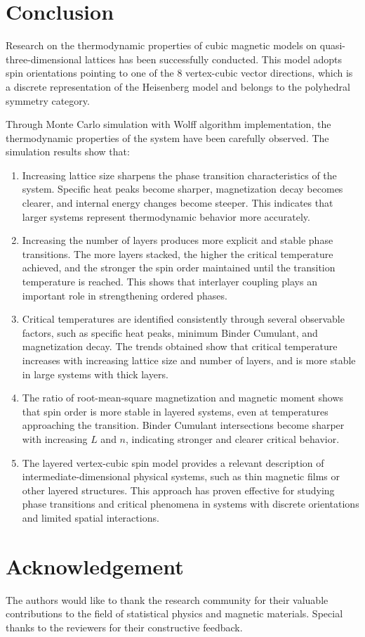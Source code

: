 \section{Conclusion}

Research on the thermodynamic properties of cubic magnetic models on quasi-three-dimensional lattices has been successfully conducted. This model adopts spin orientations pointing to one of the 8 vertex-cubic vector directions, which is a discrete representation of the Heisenberg model and belongs to the polyhedral symmetry category.

Through Monte Carlo simulation with Wolff algorithm implementation, the thermodynamic properties of the system have been carefully observed. The simulation results show that:

\begin{enumerate}
\item Increasing lattice size sharpens the phase transition characteristics of the system. Specific heat peaks become sharper, magnetization decay becomes clearer, and internal energy changes become steeper. This indicates that larger systems represent thermodynamic behavior more accurately.

\item Increasing the number of layers produces more explicit and stable phase transitions. The more layers stacked, the higher the critical temperature achieved, and the stronger the spin order maintained until the transition temperature is reached. This shows that interlayer coupling plays an important role in strengthening ordered phases.

\item Critical temperatures are identified consistently through several observable factors, such as specific heat peaks, minimum Binder Cumulant, and magnetization decay. The trends obtained show that critical temperature increases with increasing lattice size and number of layers, and is more stable in large systems with thick layers.

\item The ratio of root-mean-square magnetization and magnetic moment shows that spin order is more stable in layered systems, even at temperatures approaching the transition. Binder Cumulant intersections become sharper with increasing $L$ and $n$, indicating stronger and clearer critical behavior.

\item The layered vertex-cubic spin model provides a relevant description of intermediate-dimensional physical systems, such as thin magnetic films or other layered structures. This approach has proven effective for studying phase transitions and critical phenomena in systems with discrete orientations and limited spatial interactions.
\end{enumerate}

\section*{Acknowledgement}

The authors would like to thank the research community for their valuable contributions to the field of statistical physics and magnetic materials. Special thanks to the reviewers for their constructive feedback. 